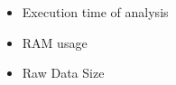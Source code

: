 \begin{frame}

		\begin{itemize}
				\item Execution time of analysis
				\item RAM usage
				\item Raw Data Size
		\end{itemize}

\end{frame}
